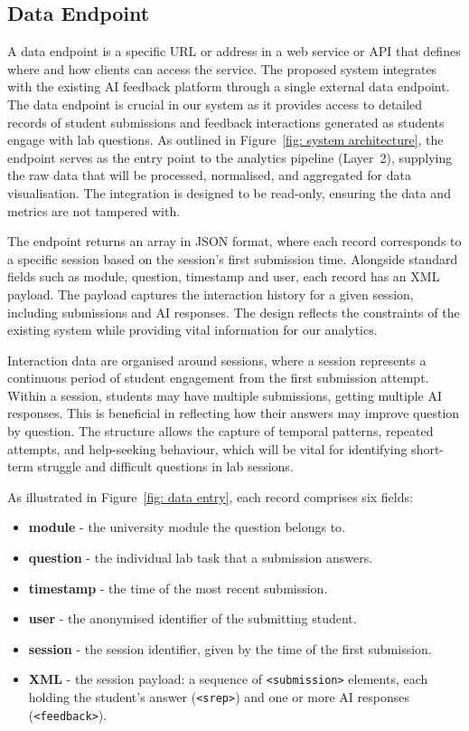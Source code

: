\subsection{Data Endpoint} \label{sec: data endpoint}
A data endpoint is a specific URL or address in a web service or API that defines where and how clients can access the service. The proposed system integrates with the existing AI feedback platform through a single external data endpoint. The data endpoint is crucial in our system as it provides access to detailed records of student submissions and feedback interactions generated as students engage with lab questions. As outlined in Figure~\ref{fig: system architecture}, the endpoint serves as the entry point to the analytics pipeline (Layer~2), supplying the raw data that will be processed, normalised, and aggregated for data visualisation. The integration is designed to be read-only, ensuring the data and metrics are not tampered with.

The endpoint returns an array in JSON format, where each record corresponds to a specific session based on the session's first submission time. Alongside standard fields such as module, question, timestamp and user, each record has an XML payload. The payload captures the interaction history for a given session, including submissions and AI responses. The design reflects the constraints of the existing system while providing vital information for our analytics.

Interaction data are organised around sessions, where a session represents a continuous period of student engagement from the first submission attempt. Within a session, students may have multiple submissions, getting multiple AI responses. This is beneficial in reflecting how their answers may improve question by question. The structure allows the capture of temporal patterns, repeated attempts, and help-seeking behaviour, which will be vital for identifying short-term struggle and difficult questions in lab sessions.

As illustrated in Figure~\ref{fig: data entry}, each record comprises six fields:
\begin{itemize}
    \item \textbf{module} - the university module the question belongs to.
    \item \textbf{question} - the individual lab task that a submission answers.
    \item \textbf{timestamp} - the time of the most recent submission.
    \item \textbf{user} - the anonymised identifier of the submitting student.
    \item \textbf{session} - the session identifier, given by the time of the first submission.
    \item \textbf{XML} - the session payload: a sequence of \texttt{<submission>} elements, each holding the student's answer (\texttt{<srep>}) and one or more AI responses (\texttt{<feedback>}).
\end{itemize}

